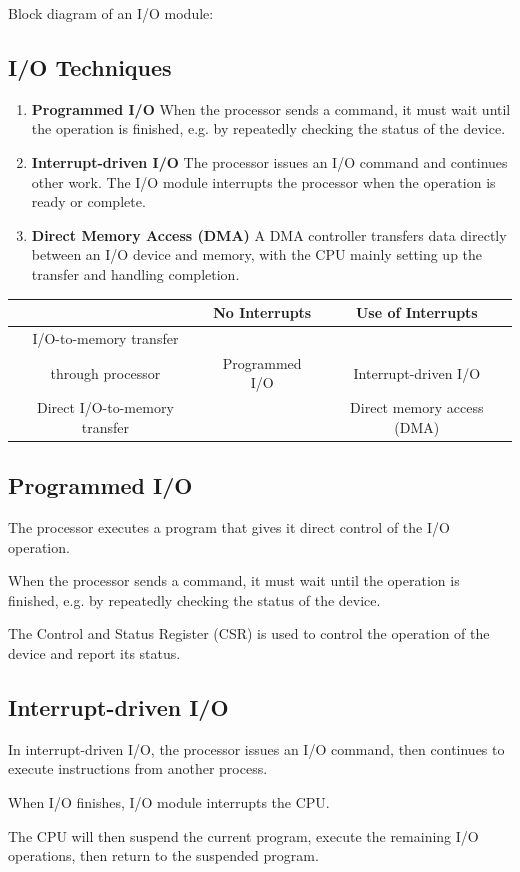 \documentclass[11pt,a4paper]{article}
\begin{document}
Block diagram of an I/O module:

\subsection{I/O Techniques}
\begin{enumerate}
    \item [\textbf{1. }] \textbf{Programmed I/O}
        When the processor sends a command, it must wait until the operation is finished, e.g. by repeatedly checking the status of the device.
    
    \item [\textbf{2. }] \textbf{Interrupt-driven I/O}
        The processor issues an I/O command and continues other work. The I/O module interrupts the processor when the operation is ready or complete.

    \item [\textbf{3. }] \textbf{Direct Memory Access (DMA)}
        A DMA controller transfers data directly between an I/O device and memory, with the CPU mainly setting up the transfer and handling completion.
\end{enumerate}

\begin{tabular}{c|cc}
    & No Interrupts & Use of Interrupts \\
    \hline
    I/O-to-memory transfer \\ through processor & Programmed I/O & Interrupt-driven I/O \\
    \hline
    Direct I/O-to-memory transfer & & Direct memory access (DMA) \\
\end{tabular}

\subsection{Programmed I/O}
The processor executes a program that gives it direct control of the I/O operation. \par
When the processor sends a command, it must wait until the operation is finished, e.g. by repeatedly checking the status of the device. \par
The Control and Status Register (CSR) is used to control the operation of the device and report its status. \par

\subsection{Interrupt-driven I/O}
In interrupt-driven I/O, the processor issues an I/O command, then continues to execute instructions from another process. \par
When I/O finishes, I/O module interrupts the CPU. \par
The CPU will then suspend the current program, execute the remaining I/O operations, then return to the suspended program.
\end{document}
